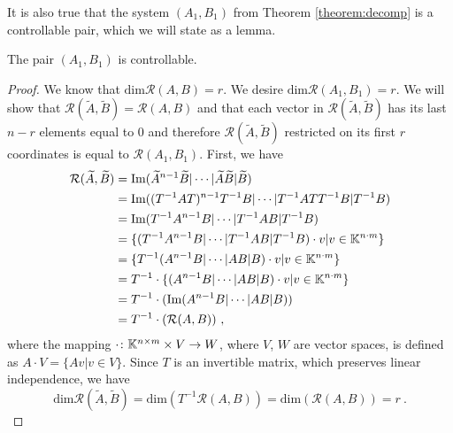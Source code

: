 It is also true that the system $(A_1,B_1)$ from Theorem \ref{theorem:decomp} is a controllable pair, which we will state as a lemma.

\begin{lemma}
	\label{lem:A_1B_1controllable}
	The pair $(A_1,B_1)$ is controllable.
\end{lemma}

\begin{proof}
	We know that $\text{dim}\mathcal{R}(A,B)=r$. We desire $\text{dim}\mathcal{R}(A_1,B_1)=r$. We will show that $\mathcal{R}(\widetilde{A},\widetilde{B})=\mathcal{R}(A,B)$ and that each vector in $\mathcal{R}(\widetilde{A},\widetilde{B})$ has its last $n-r$ elements equal to 0 and therefore $\mathcal{R}(\widetilde{A},\widetilde{B})$ restricted on its first $r$ coordinates is equal to $\mathcal{R}(A_1,B_1)$. 
	First, we have 
	\begin{align*}
		\mathcal{R}(\widetilde{A},\widetilde{B})&=\text{Im}(\widetilde{A}^{n-1}\widetilde{B}|\cdots|\widetilde{A}\widetilde{B}|\widetilde{B}) \\
		&=\text{Im}((T^{-1}AT)^{n-1}T^{-1}B|\cdots|T^{-1}ATT^{-1}B|T^{-1}B) \\
		&=\text{Im}(T^{-1}A^{n-1}B|\cdots|T^{-1}AB|T^{-1}B) \\
		&=\{(T^{-1}A^{n-1}B|\cdots|T^{-1}AB|T^{-1}B)\cdot v | v \in \mathbb{K}^{n\cdot m}\} \\
		&=\{T^{-1}(A^{n-1}B|\cdots|AB|B)\cdot v | v \in \mathbb{K}^{n\cdot m}\} \\
		&=T^{-1}\cdot\{(A^{n-1}B|\cdots|AB|B)\cdot v | v \in \mathbb{K}^{n\cdot m}\} \\
		&=T^{-1}\cdot(\text{Im}(A^{n-1}B|\cdots|AB|B)) \\
		&=T^{-1}\cdot(\mathcal{R}(A,B))
		\ ,
	\end{align*}
	where the mapping $\cdot\colon\mathbb{K}^{n\times m}\times V\rightarrow W$, where $V$, $W$ are vector spaces, is defined as $A\cdot V=\{Av|v\in V\}$. Since $T$ is an invertible matrix, which preserves linear independence, we have
	$$\text{dim}\mathcal{R}(\widetilde{A},\widetilde{B})=\text{dim}(T^{-1}\mathcal{R}(A,B))=\text{dim}(\mathcal{R}(A,B))=r\ .$$


\end{proof}
